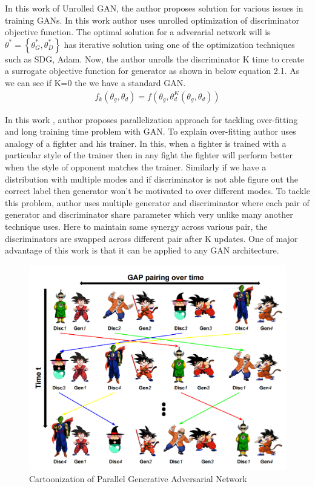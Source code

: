 In this work of Unrolled GAN, the author proposes solution for various issues in training GANs. 
In this work author uses unrolled optimization of discriminator objective function.  The optimal solution for a adverarial network will is $\theta^{*} =\left\{\theta^{*}_{G}, \theta^{*}_{D}\right\}$ has iterative solution using one of the optimization techniques such as SDG, Adam. Now, the author unrolls the discriminator K time to create a surrogate objective function for generator as shown in below equation 2.1. As we can see if K=0 the we have a standard GAN.
\begin{equation}
        \begin{aligned}
f_{k}{ \left( \theta _{g}, \theta _{d} \right) }=f \left( \theta _{g}, \theta _{d}^{K}{ \left( \theta _{g}, \theta _{d} \right) } \right)
\end{aligned}
\end{equation}

In this work \cite{1612.04021}, author proposes parallelization approach for tackling over-fitting and long training time problem with GAN. To explain over-fitting author uses analogy of a fighter and his trainer. In this, when a fighter is trained with a particular style of the trainer then in any fight the fighter will perform better when the style of opponent matches the trainer. Similarly if  we have a distribution with multiple modes and if discriminator is not able figure out the correct label then generator won't be motivated to over different modes. To tackle this problem, author uses multiple generator and discriminator where each pair of generator and discriminator share parameter which very unlike many another technique uses. Here to maintain same synergy across various pair, the discriminators are swapped across different pair after K updates.  One of major advantage of this work is that it can be applied to any GAN architecture.
\begin{figure}[H]
  \centering
    \includegraphics[scale=.3, angle=0]{Files/ParallelGAN.png}
    \caption{Cartoonization of Parallel Generative Adversarial Network}
    \label{fig:PGAN}
\end{figure}
